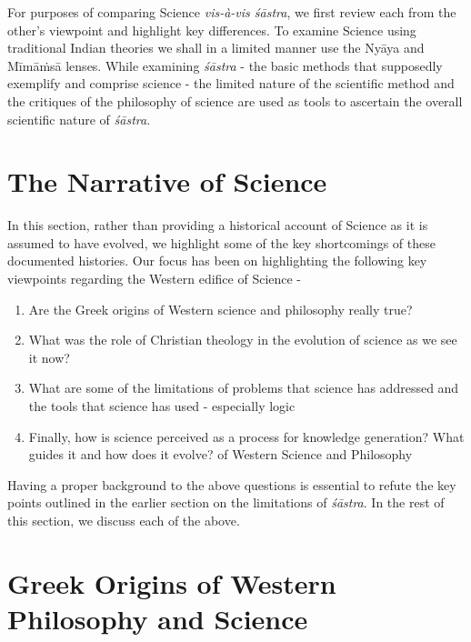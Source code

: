 For purposes of comparing Science \textit{vis-à-vis śāstra}, we first review each from the other’s viewpoint and highlight key differences. To examine Science using traditional Indian theories we shall in a limited manner use the Nyāya and Mīmāṁsā lenses. While examining \textit{śāstra} - the basic methods that supposedly exemplify and comprise science - the limited nature of the scientific method and the critiques of the philosophy of science are used as tools to ascertain the overall scientific nature of \textit{śāstra}.


\section*{The Narrative of Science }

In this section, rather than providing a historical account of Science as it is assumed to have evolved, we highlight some of the key shortcomings of these documented histories. Our focus has been on highlighting the following key viewpoints regarding the Western edifice of Science -

\begin{enumerate}
\item Are the Greek origins of Western science and philosophy really true?

 \item What was the role of Christian theology in the evolution of science as we see it now?

 \item What are some of the limitations of problems that science has addressed and the tools that science has used - especially logic

 \item Finally, how is science perceived as a process for knowledge generation? What guides it and how does it evolve?
of Western Science and Philosophy
\end{enumerate}

Having a proper background to the above questions is essential to refute the key points outlined in the earlier section on the limitations of \textit{śāstra}. In the rest of this section, we discuss each of the above.


\section*{Greek Origins of Western Philosophy and Science}

